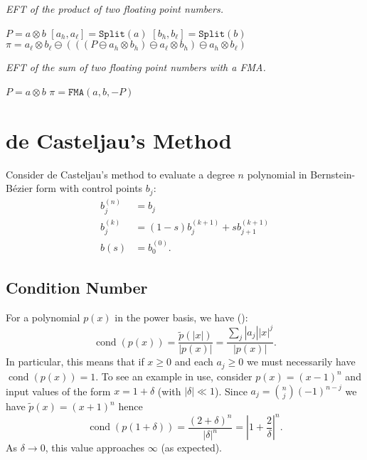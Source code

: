 \documentclass[letterpaper,10pt]{article}
\theoremstyle{definition}
\newcommand{\cond}[1]{\operatorname{cond}\left(#1\right)}
\begin{document}
\begin{algorithm}[H]
  \caption{\textit{EFT of the product of two floating point numbers.}}

  \begin{algorithmic}
      \State \(P = a \otimes b\)
      \State \(\left[a_h, a_{\ell}\right] = \mathtt{Split}(a)\)
      \State \(\left[b_h, b_{\ell}\right] = \mathtt{Split}(b)\)
      \State \(\pi = a_{\ell} \otimes b_{\ell} \ominus (((P \ominus
          a_h \otimes b_h)
          \ominus a_{\ell} \otimes b_h) \ominus a_h \otimes b_{\ell})\)
    \EndFunction
  \end{algorithmic}
\end{algorithm}

\begin{algorithm}[H]
  \caption{\textit{EFT of the sum of two floating point numbers with a FMA.}}

  \begin{algorithmic}
      \State \(P = a \otimes b\)
      \State \(\pi = \mathtt{FMA}(a, b, -P)\)
    \EndFunction
  \end{algorithmic}
\end{algorithm}

\section{de Casteljau's Method}

Consider de Casteljau's method to evaluate a degree \(n\)
polynomial in Bernstein-B\'{e}zier form with control points \(b_j\):
\begin{align}
    b_j^{(n)} &= b_j \\
    b_j^{(k)} &= (1 - s) b_j^{(k + 1)} + s b_{j + 1}^{(k + 1)} \\
    b(s) &= b_0^{(0)}.
\end{align}

\subsection{Condition Number}

For a polynomial \(p(x)\) in the power basis, we have
(\cite{langlois_et_al:DSP:2006:442}):
\begin{equation}
\cond{p(x)} = \frac{\widetilde{p}\left(\left|x\right|\right)}{
  \left|p(x)\right|} = \frac{\sum_j \left|a_j\right| \left|x\right|^j}{
  \left|p(x)\right|}.
\end{equation}
In particular, this means that if \(x \geq 0\) and each \(a_j \geq 0\)
we must necessarily have \(\cond{p(x)} = 1\). To see an example in use,
consider \(p(x) = (x - 1)^n\) and input values of the form \(x = 1 + \delta\)
(with \(\left|\delta\right| \ll 1\)). Since \(a_j = \binom{n}{j} (-1)^{n - j}\)
we have \(\widetilde{p}(x) = (x + 1)^n\) hence
\begin{equation}
\cond{p\left(1 + \delta\right)} = \frac{(2 + \delta)^n}{
  \left|\delta\right|^n} = \left|1 + \frac{2}{\delta}\right|^n.
\end{equation}
As \(\delta \to 0\), this value approaches \(\infty\) (as expected).
\end{document}

